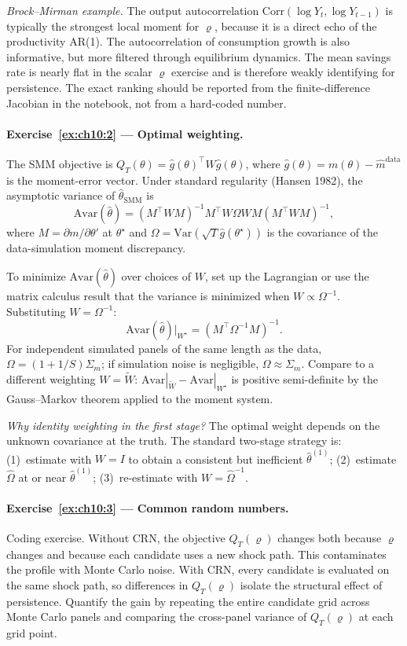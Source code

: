 \documentclass[11pt,a4paper]{report}
\begin{document}
\emph{Brock--Mirman example.}  The output autocorrelation $\mathrm{Corr}(\log Y_t,\log Y_{t-1})$ is typically the strongest local moment for $\varrho$, because it is a direct echo of the productivity AR(1).  The autocorrelation of consumption growth is also informative, but more filtered through equilibrium dynamics.  The mean savings rate is nearly flat in the scalar $\varrho$ exercise and is therefore weakly identifying for persistence.  The exact ranking should be reported from the finite-difference Jacobian in the notebook, not from a hard-coded number.

\paragraph{Exercise~\ref{ex:ch10:2} --- Optimal weighting.}
The SMM objective is $Q_T(\theta) = \hat g(\theta)^\top W \hat g(\theta)$, where $\hat g(\theta) = m(\theta) - \hat m^\mathrm{data}$ is the moment-error vector.  Under standard regularity (Hansen 1982), the asymptotic variance of $\hat\theta_\mathrm{SMM}$ is
\[
   \mathrm{Avar}(\hat\theta)
   =
   (M^\top W M)^{-1}M^\top W\Omega W M(M^\top W M)^{-1},
\]
where $M=\partial m/\partial\theta'$ at $\theta^\star$ and $\Omega=\mathrm{Var}(\sqrt{T}\hat g(\theta^\star))$ is the covariance of the data-simulation moment discrepancy.

To minimize $\mathrm{Avar}(\hat\theta)$ over choices of $W$, set up the Lagrangian or use the matrix calculus result that the variance is minimized when $W \propto \Omega^{-1}$.  Substituting $W=\Omega^{-1}$:
\[
   \mathrm{Avar}(\hat\theta)\big|_{W^\star}
   =
   (M^\top \Omega^{-1}M)^{-1}.
\]
For independent simulated panels of the same length as the data, $\Omega=(1+1/S)\Sigma_m$; if simulation noise is negligible, $\Omega\approx\Sigma_m$.  Compare to a different weighting $W=\tilde W$: $\mathrm{Avar}|_{\tilde W}-\mathrm{Avar}|_{W^\star}$ is positive semi-definite by the Gauss--Markov theorem applied to the moment system.

\emph{Why identity weighting in the first stage?}  The optimal weight depends on the unknown covariance at the truth.  The standard two-stage strategy is: (1)~estimate with $W=I$ to obtain a consistent but inefficient $\hat\theta^{(1)}$; (2)~estimate $\hat\Omega$ at or near $\hat\theta^{(1)}$; (3)~re-estimate with $W=\hat\Omega^{-1}$.

\paragraph{Exercise~\ref{ex:ch10:3} --- Common random numbers.}
Coding exercise.  Without CRN, the objective $Q_T(\varrho)$ changes both because $\varrho$ changes and because each candidate uses a new shock path.  This contaminates the profile with Monte Carlo noise.  With CRN, every candidate is evaluated on the same shock path, so differences in $Q_T(\varrho)$ isolate the structural effect of persistence.  Quantify the gain by repeating the entire candidate grid across Monte Carlo panels and comparing the cross-panel variance of $Q_T(\varrho)$ at each grid point.
\end{document}
